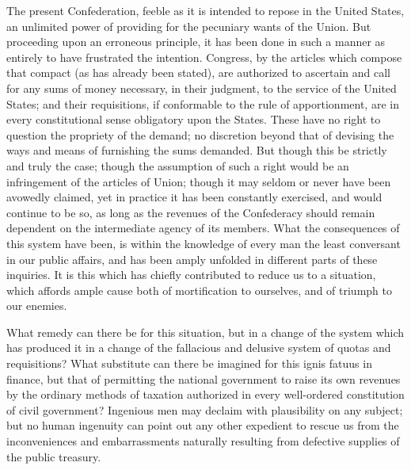 The present Confederation, feeble as it is intended to repose in the United States, an unlimited power of providing for the pecuniary wants of the Union. But proceeding upon an erroneous principle, it has been done in such a manner as entirely to have frustrated the intention. Congress, by the articles which compose that compact (as has already been stated), are authorized to ascertain and call for any sums of money necessary, in their judgment, to the service of the United States; and their requisitions, if conformable to the rule of apportionment, are in every constitutional sense obligatory upon the States. These have no right to question the propriety of the demand; no discretion beyond that of devising the ways and means of furnishing the sums demanded. But though this be strictly and truly the case; though the assumption of such a right would be an infringement of the articles of Union; though it may seldom or never have been avowedly claimed, yet in practice it has been constantly exercised, and would continue to be so, as long as the revenues of the Confederacy should remain dependent on the intermediate agency of its members. What the consequences of this system have been, is within the knowledge of every man the least conversant in our public affairs, and has been amply unfolded in different parts of these inquiries. It is this which has chiefly contributed to reduce us to a situation, which affords ample cause both of mortification to ourselves, and of triumph to our enemies.

What remedy can there be for this situation, but in a change of the system which has produced it in a change of the fallacious and delusive system of quotas and requisitions? What substitute can there be imagined for this ignis fatuus in finance, but that of permitting the national government to raise its own revenues by the ordinary methods of taxation authorized in every well-ordered constitution of civil government? Ingenious men may declaim with plausibility on any subject; but no human ingenuity can point out any other expedient to rescue us from the inconveniences and embarrassments naturally resulting from defective supplies of the public treasury.

